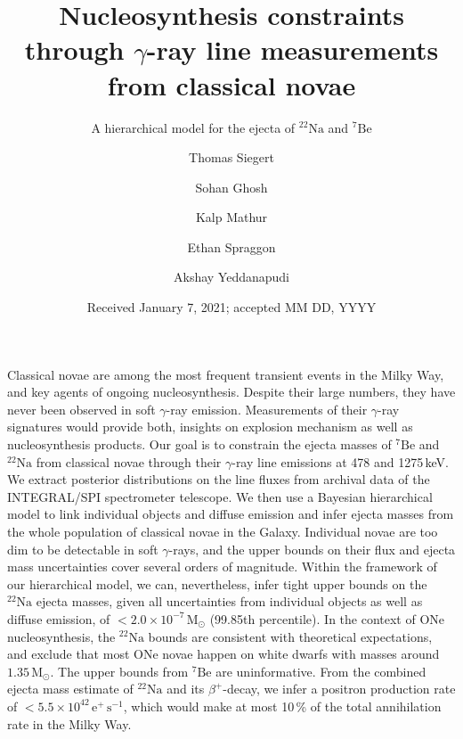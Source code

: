 \documentclass{aa}
\newcommand{\mrm}[1]{\mathrm{#1}}
\newcommand{\nuc}[2]{$\mrm{^{#2}#1}$}
\begin{document}
 


   \title{Nucleosynthesis constraints through $\gamma$-ray line measurements from classical novae}

   \subtitle{A hierarchical model for the ejecta of \nuc{Na}{22} and \nuc{Be}{7}}

\author{
  Thomas Siegert \and
  Sohan Ghosh \and
  Kalp Mathur \and
  Ethan Spraggon \and
  Akshay Yeddanapudi
}

 

   \date{Received January 7, 2021; accepted MM DD, YYYY}

\abstract
{Classical novae are among the most frequent transient events in the Milky Way, and key agents of ongoing nucleosynthesis.
%
Despite their large numbers, they have never been observed in soft $\gamma$-ray emission.
%
Measurements of their $\gamma$-ray signatures would provide both, insights on explosion mechanism as well as nucleosynthesis products.}
%
{Our goal is to constrain the ejecta masses of \nuc{Be}{7} and \nuc{Na}{22} from classical novae through their $\gamma$-ray line emissions at 478 and 1275\,keV. }
%
{We extract posterior distributions on the line fluxes from archival data of the INTEGRAL/SPI spectrometer telescope.
%
We then use a Bayesian hierarchical model to link individual objects and diffuse emission and infer ejecta masses from the whole population of classical novae in the Galaxy.}
%
{Individual novae are too dim to be detectable in soft $\gamma$-rays, and the upper bounds on their flux and ejecta mass uncertainties cover several orders of magnitude.
%
Within the framework of our hierarchical model, we can, nevertheless, infer tight upper bounds on the \nuc{Na}{22} ejecta masses, given all uncertainties from individual objects as well as diffuse emission, of $<2.0 \times 10^{-7}\,\mrm{M_{\odot}}$ (99.85th percentile).}
%
{In the context of ONe nucleosynthesis, the \nuc{Na}{22} bounds are consistent with theoretical expectations, and exclude that most ONe novae happen on white dwarfs with masses around $1.35\,\mrm{M_{\odot}}$.
%
The upper bounds from \nuc{Be}{7} are uninformative.
%
From the combined ejecta mass estimate of \nuc{Na}{22} and its $\beta^+$-decay, we infer a positron production rate of $<5.5 \times 10^{42}\,\mrm{e^+\,s^{-1}}$, which would make at most 10\,\% of the total annihilation rate in the Milky Way.} 
 
\end{document}
